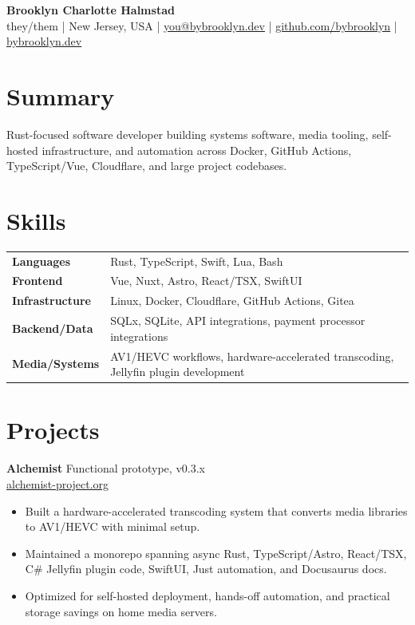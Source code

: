\documentclass[10pt,letterpaper]{article}
\newcommand{\resumeItem}[1]{\item #1}
\newcommand{\projectHeading}[3]{%
  \textbf{#1} \hfill {\small #2}\\[-1pt]
  {\small #3}
}
\newcommand{\contactSep}{\quad|\quad}
\begin{document}
\fontsize{10}{11}\selectfont

{\LARGE \textbf{Brooklyn Charlotte Halmstad}}\\[1pt]
{\small
they/them
\contactSep
New Jersey, USA
\contactSep
\href{mailto:you@bybrooklyn.dev}{you@bybrooklyn.dev}
\contactSep
\href{https://github.com/bybrooklyn}{github.com/bybrooklyn}
\contactSep
\href{https://bybrooklyn.dev}{bybrooklyn.dev}
}

\section{Summary}
Rust-focused software developer building systems software, media tooling, self-hosted infrastructure, and automation across Docker, GitHub Actions, TypeScript/Vue, Cloudflare, and large project codebases.

\section{Skills}
\begin{tabularx}{\textwidth}{@{}>{\bfseries\arraybackslash}p{1.22in} X@{}}
Languages & Rust, TypeScript, Swift, Lua, Bash \\[1pt]
Frontend & Vue, Nuxt, Astro, React/TSX, SwiftUI \\[1pt]
Infrastructure & Linux, Docker, Cloudflare, GitHub Actions, Gitea \\[1pt]
Backend/Data & SQLx, SQLite, API integrations, payment processor integrations \\[1pt]
Media/Systems & AV1/HEVC workflows, hardware-accelerated transcoding, Jellyfin plugin development \\
\end{tabularx}

\section{Projects}

\projectHeading{Alchemist}{Functional prototype, v0.3.x}{\href{https://alchemist-project.org}{alchemist-project.org}}
\begin{itemize}
  \resumeItem{Built a hardware-accelerated transcoding system that converts media libraries to AV1/HEVC with minimal setup.}
  \resumeItem{Maintained a monorepo spanning async Rust, TypeScript/Astro, React/TSX, C\# Jellyfin plugin code, SwiftUI, Just automation, and Docusaurus docs.}
  \resumeItem{Optimized for self-hosted deployment, hands-off automation, and practical storage savings on home media servers.}
\end{itemize}
\end{document}
